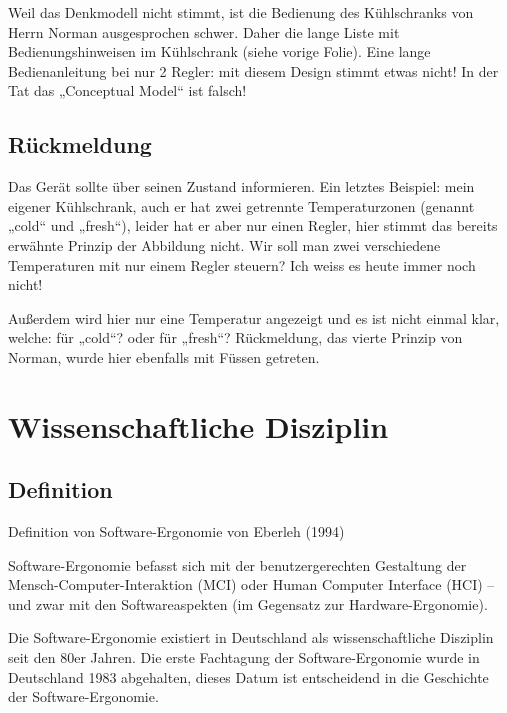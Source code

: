 Weil das Denkmodell nicht stimmt, ist die Bedienung des Kühlschranks von Herrn Norman ausgesprochen schwer. Daher die lange Liste mit Bedienungshinweisen im Kühlschrank (siehe vorige Folie). Eine lange Bedienanleitung bei nur 2 Regler: mit diesem Design stimmt etwas nicht! In der Tat das „Conceptual Model“ ist falsch!
\subsection{Rückmeldung}
Das Gerät sollte über seinen Zustand informieren.
Ein letztes Beispiel: mein eigener Kühlschrank, auch er hat zwei getrennte Temperaturzonen (genannt „cold“ und „fresh“), leider hat er aber nur einen Regler, hier stimmt das bereits erwähnte Prinzip der Abbildung nicht. Wir soll man zwei verschiedene Temperaturen mit nur einem Regler steuern? Ich weiss es heute immer noch nicht!

Außerdem wird hier nur eine Temperatur angezeigt und es ist nicht einmal klar, welche: für „cold“? oder für „fresh“?  Rückmeldung, das vierte Prinzip von Norman, wurde hier ebenfalls mit Füssen getreten. 

\section{Wissenschaftliche Disziplin}
\subsection{Definition}
Definition von Software-Ergonomie von Eberleh (1994)

Software-Ergonomie befasst sich mit der benutzergerechten Gestaltung der Mensch-Computer-Interaktion (MCI) oder Human Computer Interface (HCI) – und zwar mit den Softwareaspekten (im Gegensatz zur Hardware-Ergonomie).
 
Die Software-Ergonomie existiert in Deutschland als wissenschaftliche Disziplin seit den 80er Jahren. Die erste Fachtagung der Software-Ergonomie wurde in Deutschland 1983 abgehalten, dieses Datum ist entscheidend in die Geschichte der Software-Ergonomie.

